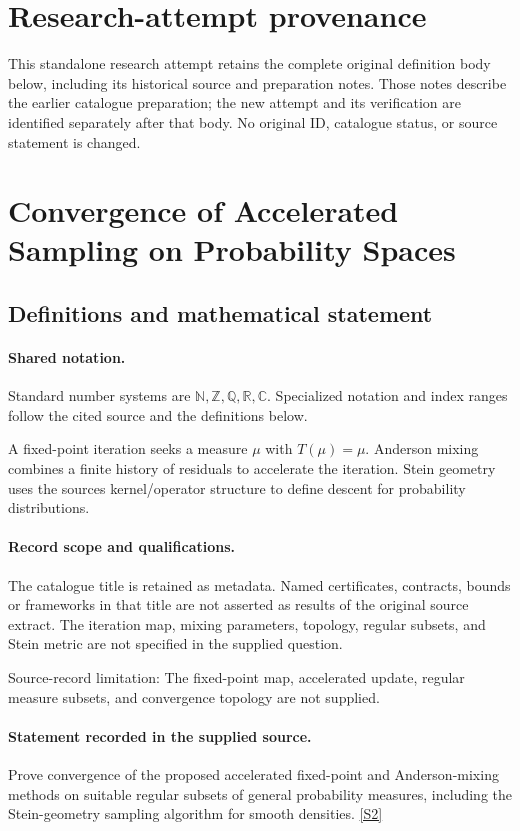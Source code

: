 \documentclass[11pt]{article}
\begin{document}
\section*{Research-attempt provenance}
This standalone research attempt retains the complete original definition body below,
including its historical source and preparation notes. Those notes describe the
earlier catalogue preparation; the new attempt and its verification are identified
separately after that body. No original ID, catalogue status, or source statement is changed.

\section{Convergence of Accelerated Sampling on Probability Spaces}\label{statement}

\subsection{Definitions and mathematical statement}

\paragraph{Shared notation.}Standard number systems are $\mathbb N,\mathbb Z,\mathbb Q,\mathbb R,\mathbb C$. Specialized notation and index ranges follow the cited source and the definitions below.


A fixed-point iteration seeks a measure $\mu$ with $T(\mu)=\mu$. Anderson mixing combines a finite history of residuals to accelerate the iteration. Stein geometry uses the source\textquotesingle s kernel/operator structure to define descent for probability distributions.
\paragraph{Record scope and qualifications.}
The catalogue title is retained as metadata. Named certificates, contracts, bounds or frameworks in that title are not asserted as results of the original source extract.
The iteration map, mixing parameters, topology, regular subsets, and Stein metric are not specified in the supplied question.

Source-record limitation: The fixed-point map, accelerated update, regular measure subsets, and convergence topology are not supplied.
\paragraph{Statement recorded in the supplied source.}
Prove convergence of the proposed accelerated fixed-point and Anderson-mixing methods on suitable regular subsets of general probability measures, including the Stein-geometry sampling algorithm for smooth densities. \href{https://doi.org/10.4171/owr/2026/13}{[S2]}
\end{document}
